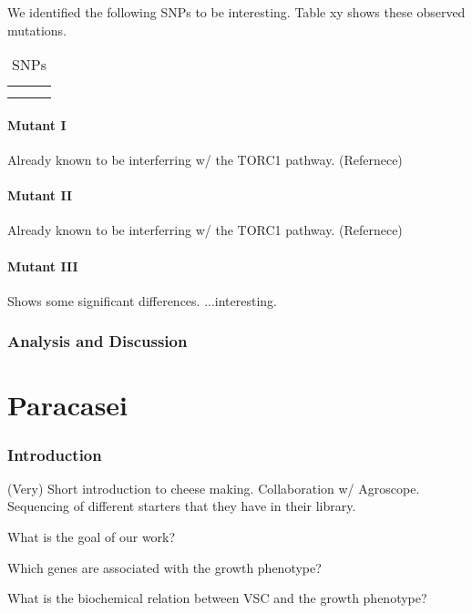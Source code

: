 \documentclass[10pt,a4paper]{article}
\begin{document}
We identified the following SNPs to be interesting. Table xy shows these observed mutations.

\begin{table}[]
\centering

\begin{tabular}{|l|l|l|}
\hline
 &  &  \\ \hline
 &  &  \\ \hline
 &  &  \\ \hline
\end{tabular}
\caption{SNPs}
\label{tab:yeastsnps}
\end{table}

\subsection{Mutant I}
Already known to be interferring w/ the TORC1 pathway. (Refernece)

\subsection{Mutant II}
Already known to be interferring w/ the TORC1 pathway. (Refernece)

\subsection{Mutant III}
Shows some significant differences. ...interesting.

\section{Analysis and Discussion}

\pagebreak
\part{Paracasei}
\setcounter{section}{0}

\section{Introduction}
(Very) Short introduction to cheese making. Collaboration w/ Agroscope. Sequencing of different starters that they have in their library.

What is the goal of our work?

Which genes are associated with the growth phenotype?

What is the biochemical relation between VSC and the growth phenotype?
\end{document}
